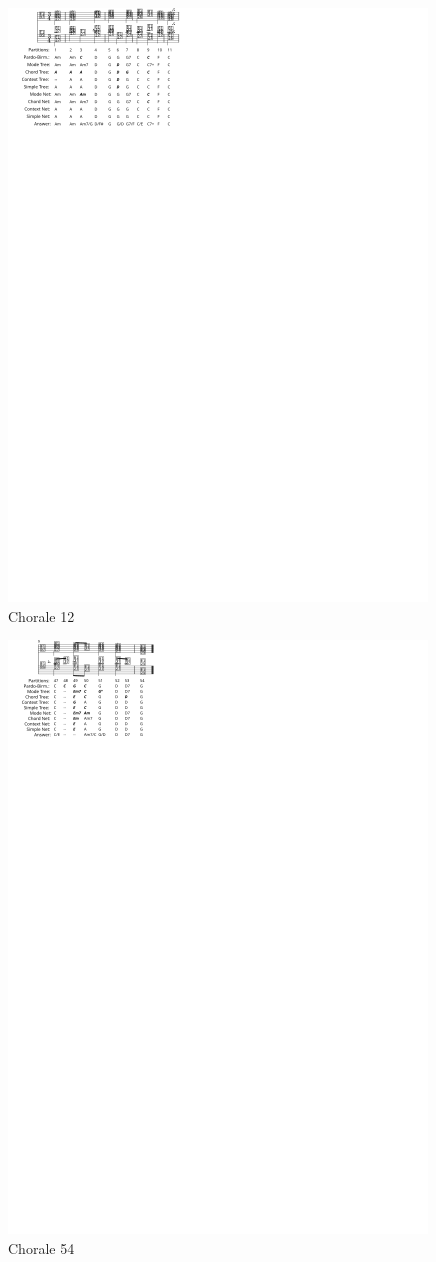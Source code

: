 \documentclass{article}
\begin{document}
\begin{figure}
  \centering
  \includegraphics[scale=4]{coral-012}
  \caption{Chorale 12}
  \label{fig:coral-12}
\end{figure}

\begin{figure}
  \centering
  \includegraphics[scale=4]{coral-054}
  \caption{Chorale 54}
  \label{fig:coral-54}
\end{figure}
\end{document}
